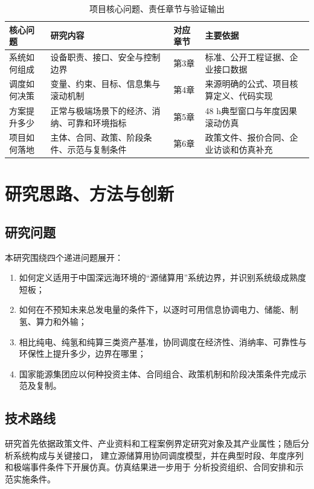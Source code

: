 \begin{table}[H]
\centering
\caption{项目核心问题、责任章节与验证输出}
\label{tab:c1-question-map}
\begin{tabularx}{\textwidth}{p{2.2cm} X p{2.5cm} p{3.2cm}}
\toprule
核心问题 & 研究内容 & 对应章节 & 主要依据\\
\midrule
系统如何组成 & 设备职责、接口、安全与控制边界 & 第3章 & 标准、公开工程证据、企业接口数据\\
调度如何决策 & 变量、约束、目标、信息集与滚动机制 & 第4章 & 来源明确的公式、项目核算定义、代码实现\\
方案提升多少 & 正常与极端场景下的经济、消纳、可靠和环境指标 & 第5章 & 48 h典型窗口与年度因果滚动仿真\\
项目如何落地 & 主体、合同、政策、阶段条件、示范与复制条件 & 第6章 & 政策文件、报价合同、企业访谈和仿真补充\\
\bottomrule
\end{tabularx}
\end{table}

\section{研究思路、方法与创新}

\subsection{研究问题}

本研究围绕四个递进问题展开：
\begin{enumerate}
  \item 如何定义适用于中国深远海环境的“源储算用”系统边界，并识别系统级成熟度短板；
  \item 如何在不预知未来总发电量的条件下，以逐时可用信息协调电力、储能、制氢、算力和外输；
  \item 相比纯电、纯氢和纯算三类资产基准，协同调度在经济性、消纳率、可靠性与环保性上提升多少，边界在哪里；
  \item 国家能源集团应以何种投资主体、合同组合、政策机制和阶段决策条件完成示范及复制。
\end{enumerate}

\subsection{技术路线}

研究首先依据政策文件、产业资料和工程案例界定研究对象及其产业属性；随后分析系统构成与关键接口，
建立源储算用协同调度模型，并在典型时段、年度序列和极端事件条件下开展仿真。仿真结果进一步用于
分析投资组织、合同安排和示范实施条件。

